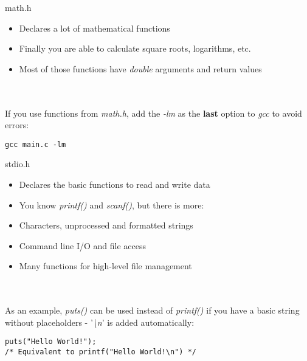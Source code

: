 
\begin{frame}[fragile]{math.h}
	\begin{itemize}
		\item Declares a lot of mathematical functions
		\item Finally you are able to calculate square roots, logarithms, etc.
		\item Most of those functions have \textit{double} arguments and return values
	\end{itemize} \ \\ \ \\
	If you use functions from \textit{math.h}, add the \textit{-lm} as the \textbf{last} option to \textit{gcc} to avoid errors:
	\begin{lstlisting}[numbers=none]
gcc main.c -lm
\end{lstlisting}
\end{frame}


\begin{frame}[fragile]{stdio.h}
	\begin{itemize}
		\item Declares the basic functions to read and write data
		\item You know \textit{printf()} and \textit{scanf()}, but there is more:
		\item Characters, unprocessed and formatted strings
		\item Command line I/O and file access
		\item Many functions for high-level file management
	\end{itemize} \ \\ \ \\
	As an example, \textit{puts()} can be used instead of \textit{printf()} if you have a basic string without placeholders - '\textit{\textbackslash n}' is added automatically:
	\begin{lstlisting}[numbers=none]
puts("Hello World!");
/* Equivalent to printf("Hello World!\n") */
\end{lstlisting}
\end{frame}


